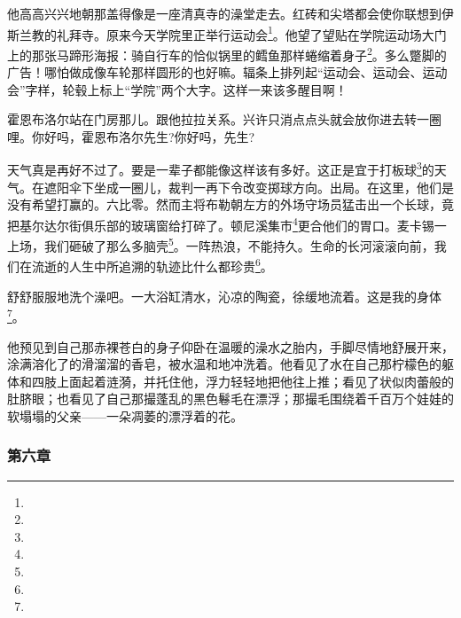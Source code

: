 \par 他高高兴兴地朝那盖得像是一座清真寺的澡堂走去。红砖和尖塔都会使你联想到伊斯兰教的礼拜寺。原来今天学院里正举行运动会\footnote{}。他望了望贴在学院运动场大门上的那张马蹄形海报：骑自行车的恰似锅里的鳕鱼那样蜷缩着身子\footnote{}。多么蹩脚的广告！哪怕做成像车轮那样圆形的也好嘛。辐条上排列起“运动会、运动会、运动会”字样，轮毂上标上“学院”两个大字。这样一来该多醒目啊！
\par 霍恩布洛尔站在门房那儿。跟他拉拉关系。兴许只消点点头就会放你进去转一圈哩。你好吗，霍恩布洛尔先生?你好吗，先生?
\par 天气真是再好不过了。要是一辈子都能像这样该有多好。这正是宜于打板球\footnote{}的天气。在遮阳伞下坐成一圈儿，裁判一再下令改变掷球方向。出局。在这里，他们是没有希望打赢的。六比零。然而主将布勒朝左方的外场守场员猛击出一个长球，竟把基尔达尔街俱乐部的玻璃窗给打碎了。顿尼溪集市\footnote{}更合他们的胃口。麦卡锡一上场，我们砸破了那么多脑壳\footnote{}。一阵热浪，不能持久。生命的长河滚滚向前，我们在流逝的人生中所追溯的轨迹比什么都珍贵\footnote{}。
\par 舒舒服服地洗个澡吧。一大浴缸清水，沁凉的陶瓷，徐缓地流着。这是我的身体\footnote{}。
\par 他预见到自己那赤裸苍白的身子仰卧在温暖的澡水之胎内，手脚尽情地舒展开来，涂满溶化了的滑溜溜的香皂，被水温和地冲洗着。他看见了水在自己那柠檬色的躯体和四肢上面起着涟漪，并托住他，浮力轻轻地把他往上推；看见了状似肉蕾般的肚脐眼；也看见了自己那撮蓬乱的黑色鬈毛在漂浮；那撮毛围绕着千百万个娃娃的软塌塌的父亲——一朵凋萎的漂浮着的花。



\subsubsection*{第六章}

